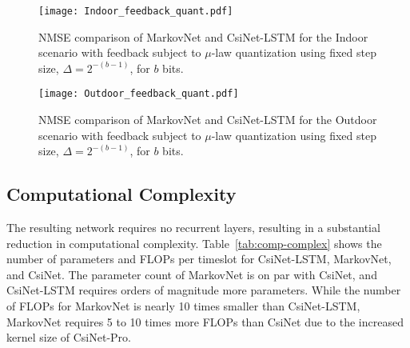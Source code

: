 \begin{figure}[!hbtp] \centering 
	\texttt{[image: Indoor\_feedback\_quant.pdf]}
    \caption{NMSE comparison of MarkovNet and CsiNet-LSTM for the Indoor scenario with feedback subject to $\mu$-law quantization using fixed step size, $\Delta=2^{-(b-1)}$, for $b$ bits.}
	\label{fig:feedback_quant_indoor} \vspace*{-2mm}
\end{figure}

\begin{figure}[!hbtp] \centering 
	\texttt{[image: Outdoor\_feedback\_quant.pdf]}
    \caption{NMSE comparison of MarkovNet and CsiNet-LSTM for the Outdoor scenario with feedback subject to $\mu$-law quantization using fixed step size, $\Delta=2^{-(b-1)}$, for $b$ bits.}
	\label{fig:feedback_quant_outdoor} \vspace*{-6mm}
\end{figure}

\subsection{Computational Complexity}

The resulting network requires no recurrent layers, resulting in a substantial reduction in computational complexity. Table~\ref{tab:comp-complex} shows the number of parameters and FLOPs per timeslot for CsiNet-LSTM, MarkovNet, and CsiNet. The parameter count of MarkovNet is on par with CsiNet, and CsiNet-LSTM requires orders of magnitude more parameters. While the number of FLOPs for MarkovNet is nearly 10 times smaller than CsiNet-LSTM, MarkovNet requires 5 to 10 times more FLOPs than CsiNet due to the increased kernel size of CsiNet-Pro.

